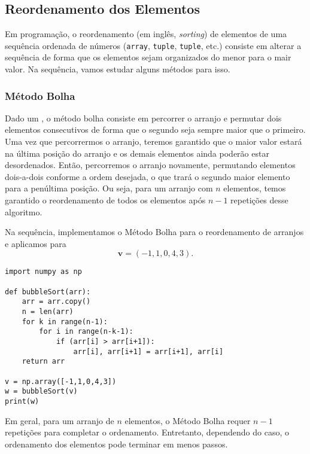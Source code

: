 \subsection{Reordenamento dos Elementos}

Em programação, o reordenamento (em inglês, \textit{sorting}) de elementos de uma sequência ordenada de números (\texttt{array}, \texttt{tuple}, \texttt{tuple}, etc.) consiste em alterar a sequência de forma que os elementos sejam organizados do menor para o mair valor. Na sequência, vamos estudar alguns métodos para isso.

\subsubsection{Método Bolha}

Dado um {\PYTHONnumpyDOTarray}, o método bolha consiste em percorrer o arranjo e permutar dois elementos consecutivos de forma que o segundo seja sempre maior que o primeiro. Uma vez que percorrermos o arranjo, teremos garantido que o maior valor estará na última posição do arranjo e os demais elementos ainda poderão estar desordenados. Então, percorremos o arranjo novamente, permutando elementos dois-a-dois conforme a ordem desejada, o que trará o segundo maior elemento para a penúltima posição. Ou seja, para um arranjo com $n$ elementos, temos garantido o reordenamento de todos os elementos após $n-1$ repetições desse algoritmo.

\begin{ex}
  Na sequência, implementamos o Método Bolha para o reordenamento de arranjos e aplicamos para
  \begin{equation}
    \pmb{v} = (-1, 1, 0, 4, 3).
  \end{equation}
  
\begin{lstlisting}[caption=bubbleSort\_v1.py]
import numpy as np

def bubbleSort(arr):
    arr = arr.copy()
    n = len(arr)
    for k in range(n-1):
        for i in range(n-k-1):
            if (arr[i] > arr[i+1]):
                arr[i], arr[i+1] = arr[i+1], arr[i]
    return arr

v = np.array([-1,1,0,4,3])
w = bubbleSort(v)
print(w)
\end{lstlisting}

\end{ex}

\begin{obs}
  Em geral, para um arranjo de $n$ elementos, o Método Bolha requer $n-1$ repetições para completar o ordenamento. Entretanto, dependendo do caso, o ordenamento dos elementos pode terminar em menos passos.
\end{obs}

